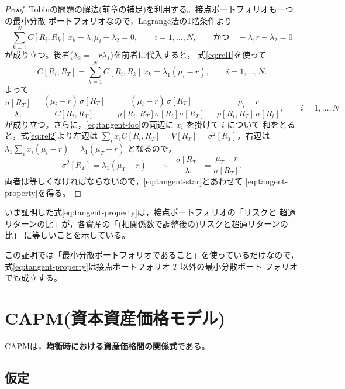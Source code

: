 \begin{proof}
Tobinの問題の解法(前章の補足)を利用する。接点ポートフォリオも一つの最小分散
ポートフォリオなので，Lagrange法の1階条件より
\[
\sum_{k=1}^{N} C[R_i,R_k]\,x_k - \lambda_1\mu_i - \lambda_2 = 0,
\qquad i=1,\dots,N,
\qquad\text{かつ}\quad
-\lambda_1 r - \lambda_2 = 0
\]
が成り立つ。後者($\lambda_2 = -r\lambda_1$)を前者に代入すると，
式\eqref{eq:rel1}を使って
\begin{equation}
C[R_i, R_T] = \sum_{k=1}^{N} C[R_i,R_k]\,x_k = \lambda_1(\mu_i - r),
\qquad i = 1,\dots,N.
\label{eq:tangent-foc}
\end{equation}
よって
\begin{equation}
\frac{\sigma[R_T]}{\lambda_1}
= \frac{(\mu_i - r)\,\sigma[R_T]}{C[R_i,R_T]}
= \frac{(\mu_i - r)\,\sigma[R_T]}{\rho[R_i,R_T]\sigma[R_i]\sigma[R_T]}
= \frac{\mu_i - r}{\rho[R_i,R_T]\,\sigma[R_i]},
\qquad i=1,\dots,N
\label{eq:tangent-star}
\end{equation}
が成り立つ。さらに，\eqref{eq:tangent-foc}の両辺に $x_i$ を掛けて $i$ について
和をとると，式\eqref{eq:rel2}より左辺は
$\sum_i x_i C[R_i,R_T] = V[R_T] = \sigma^2[R_T]$，右辺は
$\lambda_1\sum_i x_i(\mu_i - r) = \lambda_1(\mu_T - r)$ となるので，
\[
\sigma^2[R_T] = \lambda_1(\mu_T - r)
\qquad\therefore\quad
\frac{\sigma[R_T]}{\lambda_1} = \frac{\mu_T - r}{\sigma[R_T]}.
\]
両者は等しくなければならないので，\eqref{eq:tangent-star}とあわせて
\eqref{eq:tangent-property}を得る。
\end{proof}

いま証明した式\eqref{eq:tangent-property}は，接点ポートフォリオの「リスクと
超過リターンの比」が，各資産の「(相関係数で調整後の)リスクと超過リターンの比」
に等しいことを示している。

\begin{remark}
この証明では「最小分散ポートフォリオであること」を使っているだけなので，
式\eqref{eq:tangent-property}は接点ポートフォリオ $T$ 以外の最小分散ポート
フォリオでも成立する。
\end{remark}

\vspace{18pt}

\section{CAPM(資本資産価格モデル)}

CAPMは，\textbf{均衡時における資産価格間の関係式}である。

\subsection{仮定}

